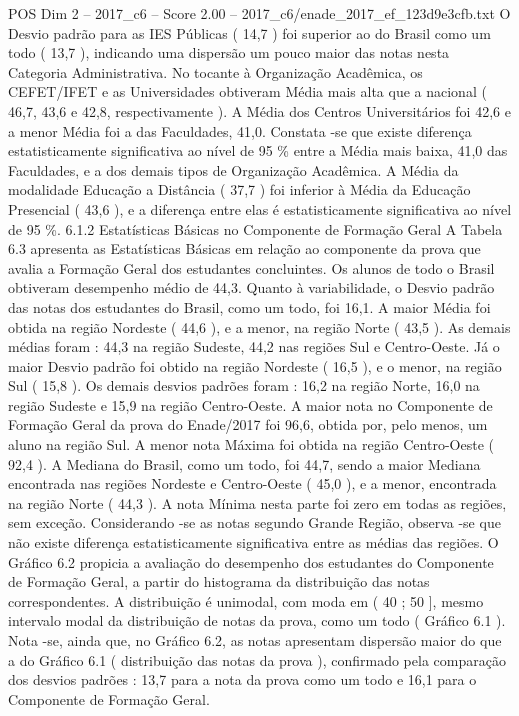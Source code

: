 \begin{textsample}{POS Dim 2 – 2017\_c6 – Score 2.00 – 2017\_c6/enade\_2017\_ef\_123d9e3cfb.txt}
O Desvio padrão para as IES Públicas ( 14,7 ) foi superior ao do Brasil como um todo ( 13,7 ), indicando uma dispersão um pouco maior das notas nesta Categoria Administrativa.
No tocante à Organização Acadêmica, os CEFET/IFET e as Universidades obtiveram Média mais alta que a nacional ( 46,7, 43,6 e 42,8, respectivamente ).
A Média dos Centros Universitários foi 42,6 e a menor Média foi a das Faculdades, 41,0.
Constata -se que existe diferença estatisticamente significativa ao nível de 95 \% entre a Média mais baixa, 41,0 das Faculdades, e a dos demais tipos de Organização Acadêmica.
A Média da modalidade Educação a Distância ( 37,7 ) foi inferior à Média da Educação Presencial ( 43,6 ), e a diferença entre elas é estatisticamente significativa ao nível de 95 \%. 6.1.2 Estatísticas Básicas no Componente de Formação Geral A Tabela 6.3 apresenta as Estatísticas Básicas em relação ao componente da prova que avalia a Formação Geral dos estudantes concluintes.
Os alunos de todo o Brasil obtiveram desempenho médio de 44,3.
Quanto à variabilidade, o Desvio padrão das notas dos estudantes do Brasil, como um todo, foi 16,1.
A maior Média foi obtida na região Nordeste ( 44,6 ), e a menor, na região Norte ( 43,5 ).
As demais médias foram : 44,3 na região Sudeste, 44,2 nas regiões Sul e Centro-Oeste.
Já o maior Desvio padrão foi obtido na região Nordeste ( 16,5 ), e o menor, na região Sul ( 15,8 ).
Os demais desvios padrões foram : 16,2 na região Norte, 16,0 na região Sudeste e 15,9 na região Centro-Oeste.
A maior nota no Componente de Formação Geral da prova do Enade/2017 foi 96,6, obtida por, pelo menos, um aluno na região Sul.
A menor nota Máxima foi obtida na região Centro-Oeste ( 92,4 ).
A Mediana do Brasil, como um todo, foi 44,7, sendo a maior Mediana encontrada nas regiões Nordeste e Centro-Oeste ( 45,0 ), e a menor, encontrada na região Norte ( 44,3 ).
A nota Mínima nesta parte foi zero em todas as regiões, sem exceção.
Considerando -se as notas segundo Grande Região, observa -se que não existe diferença estatisticamente significativa entre as médias das regiões.
O Gráfico 6.2 propicia a avaliação do desempenho dos estudantes do Componente de Formação Geral, a partir do histograma da distribuição das notas correspondentes.
A distribuição é unimodal, com moda em ( 40 ; 50 ], mesmo intervalo modal da distribuição de notas da prova, como um todo ( Gráfico 6.1 ).
Nota -se, ainda que, no Gráfico 6.2, as notas apresentam dispersão maior do que a do Gráfico 6.1 ( distribuição das notas da prova ), confirmado pela comparação dos desvios padrões : 13,7 para a nota da prova como um todo e 16,1 para o Componente de Formação Geral.

\end{textsample}

